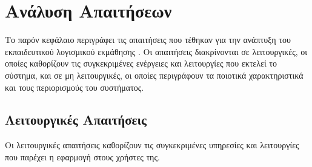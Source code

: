 \section{Ανάλυση Απαιτήσεων}
\label{sec:analysi_apaitiseon}
Το παρόν κεφάλαιο περιγράφει τις απαιτήσεις που τέθηκαν για την ανάπτυξη του εκπαιδευτικού λογισμικού εκμάθησης . Οι απαιτήσεις διακρίνονται σε λειτουργικές, οι οποίες καθορίζουν τις συγκεκριμένες ενέργειες και λειτουργίες που εκτελεί το σύστημα, και σε μη λειτουργικές, οι οποίες περιγράφουν τα ποιοτικά χαρακτηριστικά και τους περιορισμούς του συστήματος.

\subsection{Λειτουργικές Απαιτήσεις}
\label{sec:leitourgikes_apaitiseis}
Οι λειτουργικές απαιτήσεις καθορίζουν τις συγκεκριμένες υπηρεσίες και λειτουργίες που παρέχει η εφαρμογή στους χρήστες της.

